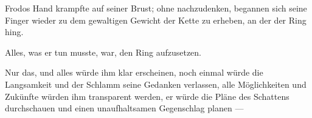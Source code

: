 Frodos Hand krampfte auf seiner Brust; ohne nachzudenken, begannen sich seine Finger wieder zu dem gewaltigen Gewicht der Kette zu erheben, an der der Ring hing.

Alles, was er tun musste, war, den Ring aufzusetzen.

Nur das, und alles würde ihm klar erscheinen, noch einmal würde die Langsamkeit und der Schlamm seine Gedanken verlassen, alle Möglichkeiten und Zukünfte würden ihm transparent werden, er würde die Pläne des Schattens durchschauen und einen unaufhaltsamen Gegenschlag planen —

